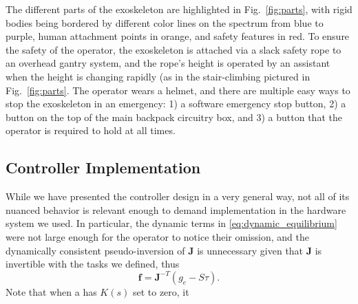The different parts of the exoskeleton are highlighted in Fig.~\ref{fig:parts}, with rigid bodies being bordered by different color lines on the spectrum from blue to purple, human attachment points in orange, and safety features in red. To ensure the safety of the operator, the exoskeleton is attached via a slack safety rope to an overhead gantry system, and the rope's height is operated by an assistant when the height is changing rapidly (as in the stair-climbing  pictured in Fig.~\ref{fig:parts}. The operator wears a helmet, and there are multiple easy ways to stop the exoskeleton in an emergency: 1) a software emergency stop button, 2) a button on the top of the main backpack circuitry box, and 3) a button that the operator is required to hold at all times. 


\subsection{Controller Implementation}
While we have presented the controller design in a very general way, not all of its nuanced behavior is relevant enough to demand implementation in the hardware system we used. In particular, the dynamic terms in \eqref{eq:dynamic_equilibrium} were not large enough for the operator to notice their omission, and the dynamically consistent pseudo-inversion of $\mathbf J$ is unnecessary given that $\mathbf J$ is invertible with the tasks we defined, thus
\begin{equation}
\mathbf f = \mathbf J^{-T} (g_e - S\tau).
\end{equation}
Note that when a  has $K(s)$ set to zero, it 


